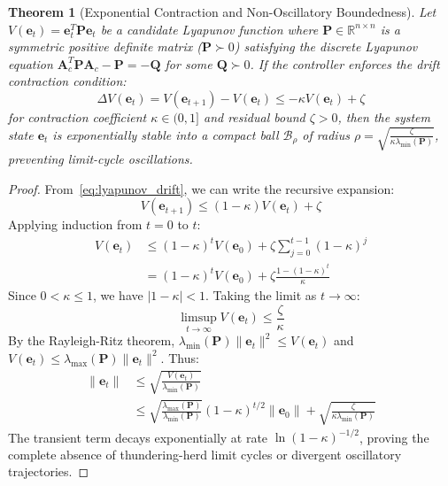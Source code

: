 \documentclass[letterpaper,twocolumn,10pt]{article}
\newtheorem{theorem}{Theorem}
\begin{document}
\begin{theorem}[Exponential Contraction and Non-Oscillatory Boundedness]
\label{thm:lyapunov_stability}
Let $V(\mathbf{e}_t) = \mathbf{e}_t^T \mathbf{P} \mathbf{e}_t$ be a candidate Lyapunov function where $\mathbf{P} \in \mathbb{R}^{n \times n}$ is a symmetric positive definite matrix ($\mathbf{P} \succ 0$) satisfying the discrete Lyapunov equation $\mathbf{A}_c^T \mathbf{P} \mathbf{A}_c - \mathbf{P} = -\mathbf{Q}$ for some $\mathbf{Q} \succ 0$. If the controller enforces the drift contraction condition:
\begin{equation}
\label{eq:lyapunov_drift}
\Delta V(\mathbf{e}_t) = V(\mathbf{e}_{t+1}) - V(\mathbf{e}_t) \le -\kappa V(\mathbf{e}_t) + \zeta
\end{equation}
for contraction coefficient $\kappa \in (0, 1]$ and residual bound $\zeta > 0$, then the system state $\mathbf{e}_t$ is exponentially stable into a compact ball $\mathcal{B}_{\rho}$ of radius $\rho = \sqrt{\frac{\zeta}{\kappa \lambda_{\min}(\mathbf{P})}}$, preventing limit-cycle oscillations.
\end{theorem}

\begin{proof}
From~\eqref{eq:lyapunov_drift}, we can write the recursive expansion:
\begin{equation}
V(\mathbf{e}_{t+1}) \le (1 - \kappa) V(\mathbf{e}_t) + \zeta
\end{equation}
Applying induction from $t = 0$ to $t$:
\begin{align}
V(\mathbf{e}_t) &\le (1 - \kappa)^t V(\mathbf{e}_0) + \zeta \sum_{j=0}^{t-1} (1 - \kappa)^j \nonumber \\
&= (1 - \kappa)^t V(\mathbf{e}_0) + \zeta \frac{1 - (1 - \kappa)^t}{\kappa}
\end{align}
Since $0 < \kappa \le 1$, we have $|1 - \kappa| < 1$. Taking the limit as $t \to \infty$:
\begin{equation}
\limsup_{t \to \infty} V(\mathbf{e}_t) \le \frac{\zeta}{\kappa}
\end{equation}
By the Rayleigh-Ritz theorem, $\lambda_{\min}(\mathbf{P}) \|\mathbf{e}_t\|^2 \le V(\mathbf{e}_t)$ and $V(\mathbf{e}_t) \le \lambda_{\max}(\mathbf{P}) \|\mathbf{e}_t\|^2$. Thus:
\begin{align}
\|\mathbf{e}_t\| &\le \sqrt{\frac{V(\mathbf{e}_t)}{\lambda_{\min}(\mathbf{P})}} \nonumber \\
&\le \sqrt{\frac{\lambda_{\max}(\mathbf{P})}{\lambda_{\min}(\mathbf{P})}} (1 - \kappa)^{t/2} \|\mathbf{e}_0\| + \sqrt{\frac{\zeta}{\kappa \lambda_{\min}(\mathbf{P})}}
\end{align}
The transient term decays exponentially at rate $\ln(1 - \kappa)^{-1/2}$, proving the complete absence of thundering-herd limit cycles or divergent oscillatory trajectories.
\end{proof}
\end{document}
